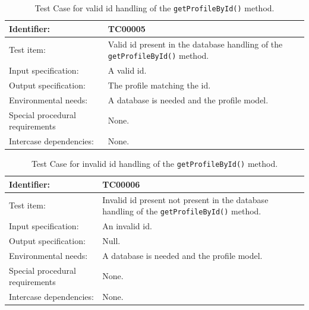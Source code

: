 \begin{table}[htbp]
	\centering
		\begin{tabular}{| p{4.5cm} | m{9cm} |}
			\hline
			Identifier: 					& TC00005 \\ \hline
			Test item:						& Valid id present in the database handling of the \texttt{getProfileById()} method. \\ \hline
			Input specification:			& A valid id. \\ \hline
			Output specification: 			& The profile matching the id. \\ \hline
			Environmental needs:			& A database is needed and the profile model. \\ \hline
			Special procedural requirements	& None. \\ \hline
			Intercase dependencies:			& None. \\ \hline
		\end{tabular}
	\caption{Test Case for valid id handling of the \texttt{getProfileById()} method.}
	\label{tab:TestCase_ValidIdHandling}
\end{table}

\begin{table}[htbp]
	\centering
		\begin{tabular}{| p{4.5cm} | m{9cm} |}
			\hline
			Identifier: 					& TC00006 \\ \hline
			Test item:						& Invalid id present not present in the database handling of the \texttt{getProfileById()} method. \\ \hline
			Input specification:			& An invalid id. \\ \hline
			Output specification: 			& Null. \\ \hline
			Environmental needs:			& A database is needed and the profile model. \\ \hline
			Special procedural requirements	& None. \\ \hline
			Intercase dependencies:			& None. \\ \hline
		\end{tabular}
	\caption{Test Case for invalid id handling of the \texttt{getProfileById()} method.}
	\label{tab:TestCase_InvalidIdHandling}
\end{table}

